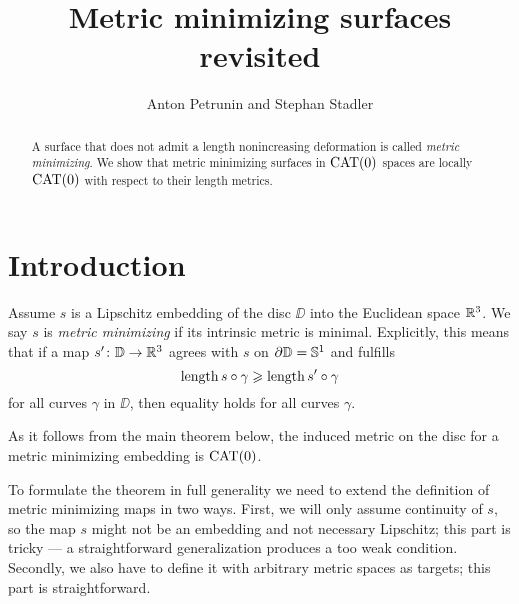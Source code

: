 \documentclass{article}
\begin{document}
\title{Metric minimizing surfaces revisited}
\author{Anton Petrunin and Stephan Stadler}

\newcommand{\Addresses}{{\bigskip\footnotesize
Anton Petrunin, \par\nopagebreak\textsc{Department of Mathematics, PSU, University Park, PA 16802, USA}
\par\nopagebreak
\textit{Email}: \texttt{petrunin@math.psu.edu}

\medskip
 
Stephan Stadler,
\par\nopagebreak\textsc{Mathematisches Institut der Universit\"at M\"unchen, Theresienstr. 39, D-80333 M\"unchen, Germany}
\par\nopagebreak
\textit{Email}: \texttt{stadler@math.lmu.de}
}}

\date{}


\maketitle

\begin{abstract}
A surface that does not admit a length nonincreasing deformation is called \emph{metric minimizing}.
We show that metric minimizing surfaces in $\mathop{\rm CAT}\nolimits(0)$ spaces are locally $\mathop{\rm CAT}\nolimits(0)$ with respect to their length metrics. 
\end{abstract}

\section{Introduction}


Assume $s$ is a Lipschitz embedding of the disc $\DD$ into the Euclidean space $\mathbb{R}^3$.
We say $s$ is \emph{metric minimizing} if its intrinsic metric is minimal. Explicitly, this means that if a map $s'\colon\mathbb{D}\to \mathbb{R}^3$ agrees with 
$s$ on $\partial \mathbb{D}=\mathbb{S}^1$ and fulfills 
\[\mathop{\rm length}\nolimits s\circ\gamma\geqslant \mathop{\rm length}\nolimits s'\circ\gamma\]
for all curves $\gamma$ in $\DD$, then equality holds for all curves $\gamma$.

As it follows from the main theorem below, the induced metric on the disc for a metric minimizing embedding is $\mathop{\rm CAT}\nolimits(0)$.

To formulate the theorem in full generality we need to extend the definition of metric minimizing maps in two ways.
First, we will only assume continuity of $s$, so the map $s$ might not be an embedding and not necessary Lipschitz;
this part is tricky --- a straightforward generalization produces a too weak condition.
Secondly, we also have to define it with arbitrary metric spaces as targets; this part is straightforward. 
\end{document}
